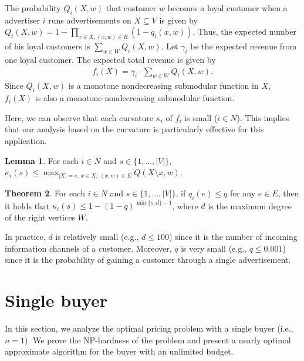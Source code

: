 \documentclass[letterpaper]{article}
\theoremstyle{definition}
\newtheorem{theorem}{Theorem}
\newtheorem{lemma}[theorem]{Lemma}
\begin{document}
The probability $Q_i(X,w)$ that customer $w$ becomes a loyal customer
when a advertiser $i$ runs advertisements on $X \subseteq V$ is given by
$Q_i(X, w) = 1 - \prod_{x \in X, (x,w) \in E}(1 - q_i(x,w))$.
Thus, the expected number of his loyal customers is $\sum_{w \in W} Q_i(X, w)$.
Let $\gamma_i$ be the expected revenue from one loyal customer.
The expected total revenue is given by
\begin{align}\label{eq:fQ}
\textstyle
f_i(X)=\gamma_i \cdot \sum_{w \in W} Q_i(X, w).
\end{align}
Since $Q_i(X, w)$ is a monotone nondecreasing submodular function in $X$,
$f_i(X)$ is also a monotone nondecreasing submodular function.



Here, we can observe that each curvature $\kappa_i$ of $f_i$ is small ($i \in N$).
This implies that our analysis based on the curvature is particularly effective for this application.
\begin{lemma}
\label{lem:curvaturebound}
For each $i \in N$ and $s \in \{1, \ldots, |V|\}$,
$\kappa_i(s) \le \max_{|X| = s,~ x \in X,~ (x,w) \in E} Q(X \setminus x, w)$.
\end{lemma}
\begin{theorem}
\label{thm:curvature}
For each $i \in N$ and $s \in \{1, \ldots, |V|\}$,
if $q_i(e) \le q$ for any $e \in E$, then
it holds that $\kappa_i(s) \le 1 - (1 - q)^{\min\{s,d\} - 1}$,
where $d$ is the maximum degree of the right vertices $W$.
\end{theorem}
In practice, $d$ is relatively small (e.g., $d \le 100$) since it is the number of incoming information channels of a customer.
Moreover, $q$ is very small (e.g., $q \le 0.001$) since it is the probability of gaining a customer through a single advertisement.




\section{Single buyer}
\label{sec:single}

In this section, we analyze the optimal pricing problem with a single buyer (i.e., $n=1$).
We prove the NP-hardness of the problem and present a nearly optimal approximate algorithm for the buyer with an unlimited budget.
\end{document}

